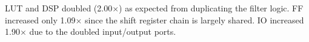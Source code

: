 \documentclass[12pt,a4paper]{article}
\begin{document}
LUT and DSP doubled (2.00$\times$) as expected from duplicating the filter logic. FF increased only 1.09$\times$ since the shift register chain is largely shared. IO increased 1.90$\times$ due to the doubled input/output ports.


\end{document}

